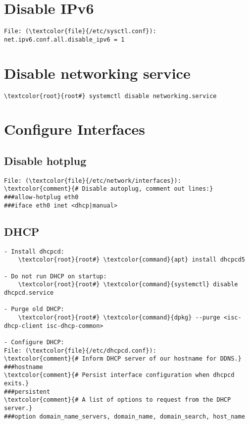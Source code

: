 \documentclass[10pt, a4paper, onecolumn, openany]{book} %
\begin{document}
\section{Disable IPv6}
\begin{Verbatim}[commandchars=\\\{\}]
File: (\textcolor{file}{/etc/sysctl.conf}):
net.ipv6.conf.all.disable_ipv6 = 1
\end{Verbatim}

\section{Disable networking service}
\begin{Verbatim}[commandchars=\\\{\}]
    \textcolor{root}{root#} systemctl disable networking.service
\end{Verbatim}

\section{Configure Interfaces}
\subsection{Disable hotplug}
\begin{Verbatim}[commandchars=\\\{\}]
File: (\textcolor{file}{/etc/network/interfaces}):
\textcolor{comment}{# Disable autoplug, comment out lines:}
###allow-hotplug eth0
###iface eth0 inet <dhcp|manual>
\end{Verbatim}
\subsection{DHCP}
\begin{Verbatim}[commandchars=\\\{\}]
- Install dhcpcd:
    \textcolor{root}{root#} \textcolor{command}{apt} install dhcpcd5

- Do not run DHCP on startup:
    \textcolor{root}{root#} \textcolor{command}{systemctl} disable dhcpcd.service

- Purge old DHCP:
    \textcolor{root}{root#} \textcolor{command}{dpkg} --purge <isc-dhcp-client isc-dhcp-common>
    
- Configure DHCP:
File: (\textcolor{file}{/etc/dhcpcd.conf}):
\textcolor{comment}{# Inform DHCP server of our hostname for DDNS.}
###hostname
\textcolor{comment}{# Persist interface configuration when dhcpcd exits.}
###persistent
\textcolor{comment}{# A list of options to request from the DHCP server.}
###option domain_name_servers, domain_name, domain_search, host_name
\end{Verbatim}
\end{document}

